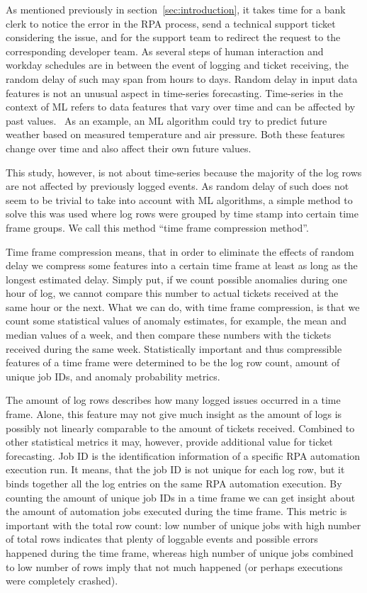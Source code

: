 As mentioned previously in section~\ref{sec:introduction},
it takes time for a bank clerk to notice the error in the RPA process,
send a technical support ticket considering the issue,
and for the support team to redirect the request to the corresponding developer team.
As several steps of human interaction and workday schedules
are in between the event of logging and ticket receiving,
the random delay of such may span from hours to days.
Random delay in input data features
is not an unusual aspect in time-series forecasting.
Time-series in the context of ML
refers to data features that vary over time
and can be affected by past values.~\cite{palma2016time}
As an example,
an ML algorithm could try to predict future weather
based on measured temperature and air pressure.
Both these features change over time
and also affect their own future values.

This study, however,
is not about time-series
because the majority of the log rows
are not affected by previously logged events.
As random delay of such
does not seem to be trivial to take into account
with ML algorithms,
a simple method to solve this was used
where log rows were grouped by time stamp
into certain time frame groups.
We call this method \enquote{time frame compression method}.

Time frame compression means,
that in order to eliminate the effects of random delay
we compress some features into a certain time frame
at least as long as the longest estimated delay.
Simply put,
if we count possible anomalies during one hour of log,
we cannot compare this number to actual tickets received
at the same hour or the next.
What we can do,
with time frame compression,
is that we count some statistical values of anomaly estimates,
for example, the mean and median values of a week,
and then compare these numbers with the tickets received
during the same week.
Statistically important and thus compressible features of a time frame
were determined to be the log row count,
amount of unique job IDs, and anomaly probability metrics.

The amount of log rows describes
how many logged issues occurred in a time frame.
Alone,
this feature may not give much insight
as the amount of logs is possibly not linearly comparable
to the amount of tickets received.
Combined to other statistical metrics
it may, however,
provide additional value for ticket forecasting.
Job ID is the identification information of a specific RPA automation execution run.
It means,
that the job ID is not unique for each log row,
but it binds together all the log entries on the same RPA automation execution.
By counting the amount of unique job IDs in a time frame
we can get insight about the amount of automation jobs executed during the time frame.
This metric is important with the total row count:
low number of unique jobs with high number of total rows
indicates that plenty of loggable events and possible errors happened during the time frame,
whereas high number of unique jobs combined to low number of rows
imply that not much happened (or perhaps executions were completely crashed).

